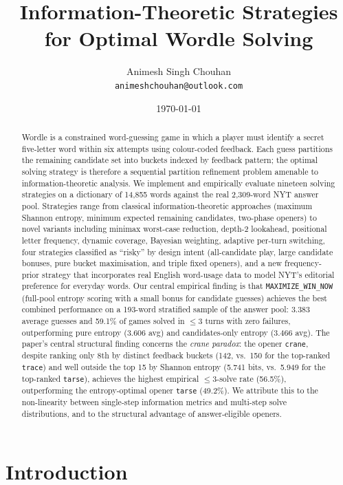 \documentclass{article}
\title{Information-Theoretic Strategies for Optimal Wordle Solving}
\author{
  Animesh Singh Chouhan \\
  \texttt{animeshchouhan@outlook.com}
}
\date{\today}
\begin{document}
\maketitle

\begin{abstract}
Wordle is a constrained word-guessing game in which a player must identify a
secret five-letter word within six attempts using colour-coded feedback. Each
guess partitions the remaining candidate set into buckets indexed by feedback
pattern; the optimal solving strategy is therefore a sequential partition
refinement problem amenable to information-theoretic analysis. We implement and
empirically evaluate nineteen solving strategies on a dictionary of 14,855 words
against the real 2,309-word NYT answer pool. Strategies range from classical
information-theoretic approaches (maximum Shannon entropy, minimum expected
remaining candidates, two-phase openers) to novel variants including minimax
worst-case reduction, depth-2 lookahead, positional letter frequency, dynamic
coverage, Bayesian weighting, adaptive per-turn switching, four strategies classified as ``risky'' by design intent (all-candidate play,
large candidate bonuses, pure bucket maximisation, and triple fixed openers),
and a new frequency-prior strategy that incorporates real English
word-usage data to model NYT's editorial preference for everyday words.
Our central empirical finding is that \texttt{MAXIMIZE\_WIN\_NOW} (full-pool entropy
scoring with a small bonus for candidate guesses) achieves the best combined
performance on a 193-word stratified sample of the answer pool: 3.383 average guesses and 59.1\% of games solved in $\leq 3$ turns with
zero failures, outperforming pure entropy (3.606 avg) and candidates-only entropy
(3.466 avg). The paper's central structural finding concerns the \emph{crane paradox}: the opener
\texttt{crane}, despite ranking only 8th by distinct feedback buckets (142,
vs.\ 150 for the top-ranked \texttt{trace}) and well outside the top 15 by
Shannon entropy (5.741 bits, vs.\ 5.949 for the top-ranked \texttt{tarse}),
achieves the highest empirical $\leq 3$-solve rate (56.5\%),
outperforming the entropy-optimal opener \texttt{tarse} (49.2\%).
We attribute this to the non-linearity between single-step information metrics
and multi-step solve distributions, and to the structural advantage of
answer-eligible openers.
\end{abstract}

\section{Introduction}
\end{document}
